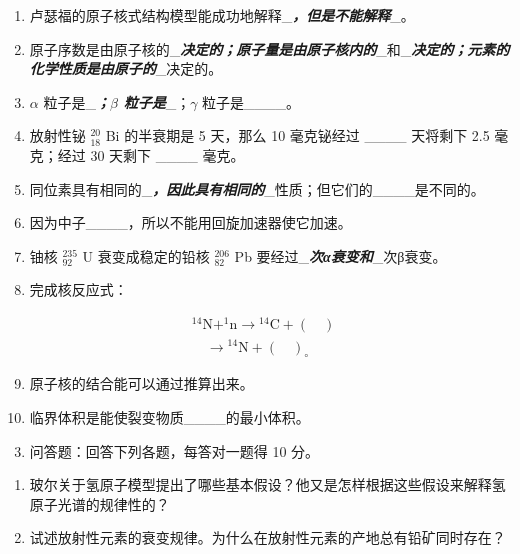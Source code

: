 \begin{enumerate}
\item
  卢瑟福的原子核式结构模型能成功地解释\_\textbf{\emph{，但是不能解释}}\_。
\item
  原子序数是由原子核的\_\textbf{\emph{决定的；原子量是由原子核内的}}\_和\_\textbf{\emph{决定的；元素的化学性质是由原子的}}\_决定的。
\item
  \(\alpha\) 粒子是\_\textbf{\emph{；\(\beta\) 粒子是}}\_；\(\gamma\)
  粒子是\_\_\_\_。
\item
  放射性铋 \(^{20}_{18}\) Bi 的半衰期是 5 天，那么 10 毫克铋经过
  \_\_\_\_ 天将剩下 2.5 毫克；经过 30 天剩下 \_\_\_\_ 毫克。
\item
  同位素具有相同的\_\textbf{\emph{，因此具有相同的}}\_性质；但它们的\_\_\_\_是不同的。
\item
  因为中子\_\_\_\_，所以不能用回旋加速器使它加速。
\item
  铀核 \(^{235}_{92}\) U 衰变成稳定的铅核 \(^{206}_{82}\) Pb
  要经过\_\textbf{\emph{次α衰变和}}\_次β衰变。
\item
  完成核反应式：
\end{enumerate}

\[
\begin{array}{rl} & {^ {14} \mathrm{N} + ^ {1} \mathrm{n} \longrightarrow {} ^ {14} \mathrm{C} + (\quad)} \\ & {\quad \longrightarrow {} ^ {14} \mathrm{N} + (\quad) _ {\circ}} \end{array}
\]

\begin{enumerate}
\setcounter{enumi}{8}
\item
  原子核的结合能可以通过推算出来。
\item
  临界体积是能使裂变物质\_\_\_\_的最小体积。
\end{enumerate}

\begin{enumerate}[label=\Roman*.]
\setcounter{enumi}{2}
\item
  问答题：回答下列各题，每答对一题得 10 分。
\end{enumerate}

\begin{enumerate}
\item
  玻尔关于氢原子模型提出了哪些基本假设？他又是怎样根据这些假设来解释氢原子光谱的规律性的？
\item
  试述放射性元素的衰变规律。为什么在放射性元素的产地总有铅矿同时存在？
\end{enumerate}

